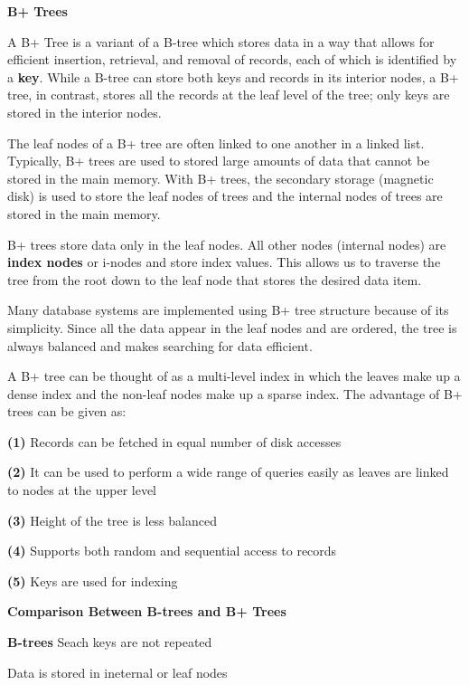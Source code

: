 \filbreak
\vskip 1cm
{\bf B+ Trees}

\vskip 1mm
A B+ Tree is a variant of a B-tree which stores data in a way that allows for efficient insertion, retrieval, and removal of records, each of which is identified by a {\bf key}. While a B-tree can store both keys and records in its interior nodes, a B+ tree, in contrast, stores all the records at the leaf level of the tree; only keys are stored in the interior nodes.

\vskip 1mm
The leaf nodes of a B+ tree are often linked to one another in a linked list. Typically, B+ trees are used to stored large amounts of data that cannot be stored in the main memory. With B+ trees, the secondary storage (magnetic disk) is used to store the leaf nodes of trees and the internal nodes of trees are stored in the main memory.

\vskip 1mm
B+ trees store data only in the leaf nodes. All other nodes (internal nodes) are {\bf index nodes} or {i-nodes} and store index values. This allows us to traverse the tree from the root down to the leaf node that stores the desired data item.

\vskip 1mm Many database systems are implemented using B+ tree structure because of its simplicity. Since all the data appear in the leaf nodes and are ordered, the tree is always balanced and makes searching for data efficient.

\vskip 1mm
A B+ tree can be thought of as a multi-level index in which the leaves make up a dense index and the non-leaf nodes make up a sparse index. The advantage of B+ trees can be given as:

\vskip 1mm
{\bf(1)} Records can be fetched in equal number of disk accesses

\vskip 3mm
{\bf(2)} It can be used to perform a wide range of queries easily as leaves are linked to nodes at the upper level

\vskip 3mm
{\bf(3)} Height of the tree is less balanced

\vskip 3mm
{\bf(4)} Supports both random and sequential access to records

\vskip 3mm
{\bf(5)} Keys are used for indexing

\vskip 3mm
{\bf Comparison Between B-trees and B+ Trees}

\vskip 1mm
{\bf B-trees}
\vskip 1mm
 Seach keys are not repeated

\vskip 3mm
 Data is stored in ineternal or leaf nodes

